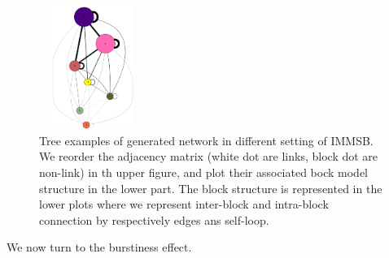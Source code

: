 \begin{figure}[h]
	\endminipage
	\includegraphics[width=3.5cm, height=4cm]{img/M_g_regular/graph_dot}
	\endminipage
	\caption{Tree examples of generated network in different setting of IMMSB. We reorder the adjacency matrix (white dot are links, block dot are non-link) in th upper figure, and plot their associated bock model structure in the lower part. The block structure is represented in the lower plots where we represent inter-block and intra-block connection by respectively edges ans self-loop.  }
	\label{fig:gen_blocks}
\end{figure}


 We now turn to the burstiness effect.
